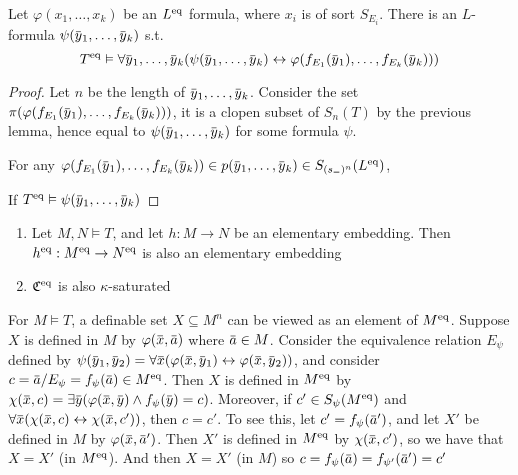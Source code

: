 \documentclass[11pt]{article}
\begin{document}
\begin{proposition}[]
Let \(\varphi(x_1,\dots,x_k)\) be an \(L^{\operatorname{eq}}\) formula, where \(x_i\) is of sort \(S_{E_i}\). There is
an \(L\)-formula \(\psi(\bary_1,\dots,\bary_k)\) s.t.
\begin{equation*}
T^{\eq}\vDash\forall \bary_1,\dots,\bary_k(\psi(\bary_1,\dots,\bary_k)\leftrightarrow\varphi(f_{E_1}(\bary_1),\dots,f_{E_k}(\bary_k)))
\end{equation*}
\end{proposition}

\begin{proof}
Let \(n\) be the length of \(\bary_1,\dots,\bary_k\). Consider the
set \(\pi(\varphi(f_{E_1}(\bary_1),\dots,f_{E_k}(\bary_k)))\), it is a clopen subset of \(S_n(T)\) by the
previous lemma, hence equal to \(\psi(\bary_1,\dots,\bary_k)\) for some formula \(\psi\).

For any \(\varphi(f_{E_1}(\bary_1),\dots,f_{E_k}(\bary_k))\in p(\bary_1,\dots,\bary_k)\in S_{(s_=)^n}(L^{\eq})\),

If \(T^{\eq}\vDash\psi(\bary_1,\dots,\bary_k)\)
\end{proof}

\begin{corollary}[]
\begin{enumerate}
\item Let \(M,N\vDash T\), and let \(h:M\to N\) be an elementary embedding.
Then \(h^{\operatorname{eq}}:M^{\operatorname{eq}}\to N^{\operatorname{eq}}\) is also an elementary embedding
\item \(\mathfrak{C}^{\operatorname{eq}}\) is also \(\kappa\)-saturated
\end{enumerate}
\end{corollary}

\begin{remark}
For \(M\vDash T\), a definable set \(X\subseteq M^n\) can be viewed as an element of \(M^{\operatorname{eq}}\).
Suppose \(X\) is defined in \(M\) by \(\varphi(\barx,\bara)\) where \(\bara\in M\). Consider the
equivalence relation \(E_\psi\) defined
by \(\psi(\bary_1,\bary_2)=\forall\barx(\varphi(\barx,\bary_1)\leftrightarrow\varphi(\barx,\bary_2))\), and
consider \(c=\bara/E_\psi=f_\psi(\bara)\in M^{\eq}\). Then \(X\) is defined in \(M^{\operatorname{eq}}\)
by \(\chi(\barx,c)=\exists\bary(\varphi(\barx,\bary)\wedge f_\psi(\bary)=c)\). Moreover, if \(c'\in S_\psi(M^{\operatorname{eq}})\)
and \(\forall\barx(\chi(\barx,c)\leftrightarrow\chi(\barx,c'))\), then \(c=c'\). To see this, let \(c'=f_{\psi}(\bara')\),
and let \(X'\) be defined in \(M\) by \(\varphi(\barx,\bara')\). Then \(X'\) is defined in \(M^{\operatorname{eq}}\)
by \(\chi(\barx,c')\), so we have that \(X=X'\) (in \(M^{\operatorname{eq}}\)). And then \(X=X'\) (in \(M\))
so \(c=f_{\psi}(\bara)=f_{\psi'}(\bara')=c'\)
\end{remark}
\end{document}
